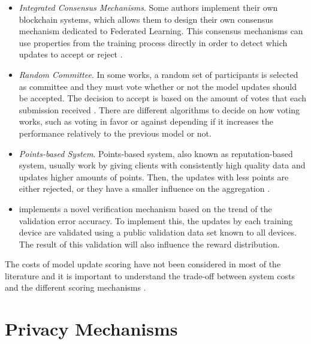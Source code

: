 \begin{itemize}
    \item \textit{Integrated Consensus Mechanisms}. Some authors implement their own blockchain systems, which allows them to design their own consensus mechanism dedicated to Federated Learning. This consensus mechanisms can use properties from the training process directly in order to detect which updates to accept or reject \cite{9293091, 10.1007/978-981-15-9213-3_12}.
    
    \item \textit{Random Committee}. In some works, a random set of participants is selected as committee and they must vote whether or not the model updates should be accepted. The decision to accept is based on the amount of votes that each submission received \cite{9159643}. There are different algorithms to decide on how voting works, such as voting in favor or against depending if it increases the performance relatively to the previous model or not.
    
    \item \textit{Points-based System}. Points-based system, also known as reputation-based system, usually work by giving clients with consistently high quality data and updates higher amounts of points. Then, the updates with less points are either rejected, or they have a smaller influence on the aggregation  \cite{10.48550/arxiv.2011.07516, 9170559, Peyvandi2022, 9292450}.
    
    \item \cite{8945913} implements a novel verification mechanism based on the trend of the validation error accuracy. To implement this, the updates by each training device are validated using a public validation data set known to all devices. The result of this validation will also influence the reward distribution.

\end{itemize}

The costs of model update scoring have not been considered in most of the literature and it is important to understand the trade-off between system costs and the different scoring mechanisms \cite{9403374, 10.48550/arxiv.2110.02182}.

\section{Privacy Mechanisms}



